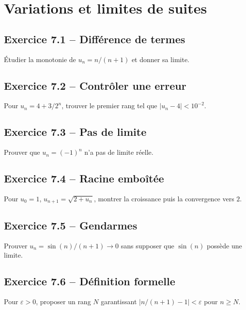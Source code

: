 \chapter{Variations et limites de suites}
\section*{Exercice 7.1 -- Différence de termes}
Étudier la monotonie de $u_n=n/(n+1)$ et donner sa limite.

\section*{Exercice 7.2 -- Contrôler une erreur}
Pour $u_n=4+3/2^n$, trouver le premier rang tel que $|u_n-4|<10^{-2}$.

\section*{Exercice 7.3 -- Pas de limite}
Prouver que $u_n=(-1)^n$ n'a pas de limite réelle.

\section*{Exercice 7.4 -- Racine emboîtée}
Pour $u_0=1$, $u_{n+1}=\sqrt{2+u_n}$, montrer la croissance puis la convergence vers $2$.

\section*{Exercice 7.5 -- Gendarmes}
Prouver $u_n=\sin(n)/(n+1)\to0$ sans supposer que $\sin(n)$ possède une limite.

\section*{Exercice 7.6 -- Définition formelle}
Pour $\varepsilon>0$, proposer un rang $N$ garantissant $|n/(n+1)-1|<\varepsilon$ pour $n\ge N$.
